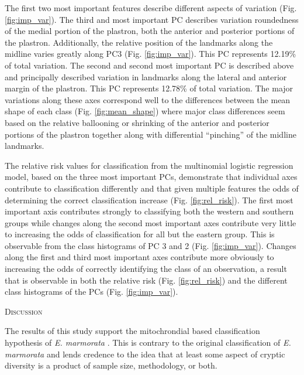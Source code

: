 \documentclass[12pt,letterpaper]{article}\usepackage{graphicx, color}
\renewcommand{\section}[1]{%
\bigskip
\begin{center}
\begin{Large}
\normalfont\scshape #1
\medskip
\end{Large}
\end{center}}
\begin{document}
The first two most important features describe different aspects of variation (Fig. \ref{fig:imp_var}). The third and most important PC describes variation roundedness of the medial portion of the plastron, both the anterior and posterior portions of the plastron. Additionally, the relative position of the landmarks along the midline varies greatly along PC3 (Fig. \ref{fig:imp_var}). This PC represents 12.19\% of total variation. The second and second most important PC is described above and principally described variation in landmarks along the lateral and anterior margin of the plastron. This PC represents 12.78\% of total variation. The major variations along these axes correspond well to the differences between the mean shape of each class (Fig. \ref{fig:mean_shape}) where major class differences seem based on the relative ballooning or shrinking of the anterior and posterior portions of the plastron together along with differential ``pinching'' of the midline landmarks.

The relative risk values for classification from the multinomial logistic regression model, based on the three most important PCs, demonstrate that individual axes contribute to classification differently and that given multiple features the odds of determining the correct classification increase (Fig. \ref{fig:rel_risk}). The first most important axis contributes strongly to classifying both the western and southern groups while changes along the second most important axes contribute very little to increasing the odds of classification for all but the eastern group. This is observable from the class histograms of PC 3 and 2 (Fig. \ref{fig:imp_var}). Changes along the first and third most important axes contribute more obviously to increasing the odds of correctly identifying the class of an observation, a result that is observable in both the relative risk (Fig. \ref{fig:rel_risk}) and the different class histograms of the PCs (Fig. \ref{fig:imp_var}).

\section{Discussion}
The results of this study support the mitochrondial based classification hypothesis of \textit{E. marmorata} \citep{Spinks2005,Spinks2010}. This is contrary to the original classification of \textit{E. marmorata} \citep{Seeliger1945,Holland1992} and lends credence to the idea that at least some aspect of cryptic diversity is a product of sample size, methodology, or both.
\end{document}
